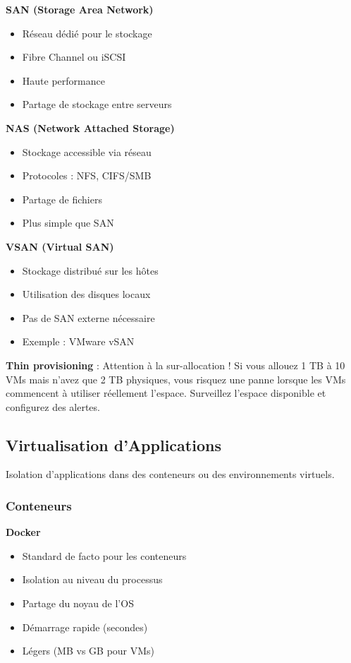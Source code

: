 \documentclass[11pt,a4paper]{article}
\begin{document}
\textbf{SAN (Storage Area Network)}
\begin{itemize}
    \item Réseau dédié pour le stockage
    \item Fibre Channel ou iSCSI
    \item Haute performance
    \item Partage de stockage entre serveurs
\end{itemize}

\textbf{NAS (Network Attached Storage)}
\begin{itemize}
    \item Stockage accessible via réseau
    \item Protocoles : NFS, CIFS/SMB
    \item Partage de fichiers
    \item Plus simple que SAN
\end{itemize}

\textbf{VSAN (Virtual SAN)}
\begin{itemize}
    \item Stockage distribué sur les hôtes
    \item Utilisation des disques locaux
    \item Pas de SAN externe nécessaire
    \item Exemple : VMware vSAN
\end{itemize}

\begin{dangerbox}
\textbf{Thin provisioning} : Attention à la sur-allocation ! Si vous allouez 1 TB à 10 VMs mais n'avez que 2 TB physiques, vous risquez une panne lorsque les VMs commencent à utiliser réellement l'espace. Surveillez l'espace disponible et configurez des alertes.
\end{dangerbox}

\subsection{Virtualisation d'Applications}

Isolation d'applications dans des conteneurs ou des environnements virtuels.

\subsubsection{Conteneurs}

\textbf{Docker}
\begin{itemize}
    \item Standard de facto pour les conteneurs
    \item Isolation au niveau du processus
    \item Partage du noyau de l'OS
    \item Démarrage rapide (secondes)
    \item Légers (MB vs GB pour VMs)
\end{itemize}
\end{document}
